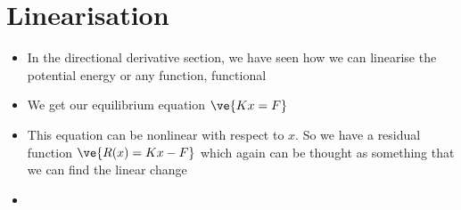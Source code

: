 
\section{Linearisation}

\begin{frame}
	\begin{itemize}
		\item  In the directional derivative section, we have seen how we can linearise the potential energy or any function, functional
		\item We get our equilibrium equation $\ve{Kx = F}$
		\item This equation can be nonlinear with respect to $x$. So we have a residual function  $\ve{R(x)= Kx - F}$ which again can be thought as something that we can find the linear change
		\item 
	\end{itemize}
\end{frame}